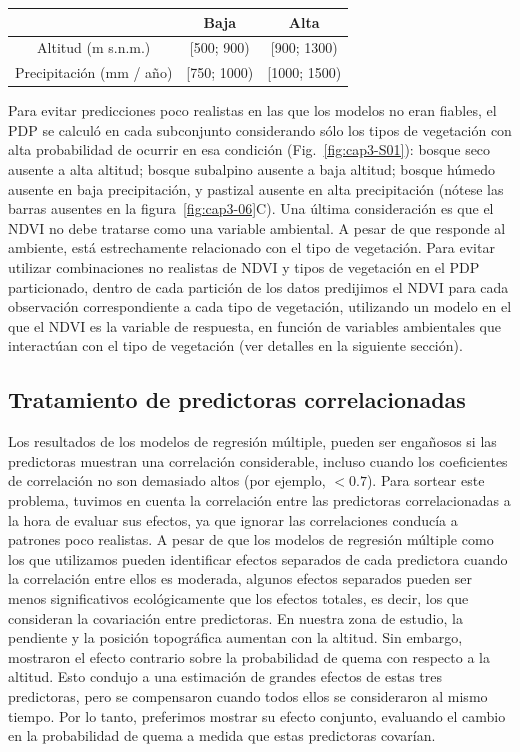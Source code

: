 \begin{table}[h!]
\centering
\begin{tabular}{c|cc}
  & Baja & Alta \\
\hline
Altitud (m s.n.m.) & [500; 900) & [900; 1300) \\
Precipitación (mm / año) & [750; 1000) & [1000; 1500) \\
\end{tabular}
\end{table}

Para evitar predicciones poco realistas en las que los modelos no eran fiables, el PDP se calculó en cada subconjunto considerando sólo los tipos de vegetación con alta probabilidad de ocurrir en esa condición (Fig.~\ref{fig:cap3-S01}): bosque seco ausente a alta altitud; bosque subalpino ausente a baja altitud; bosque húmedo ausente en baja precipitación, y pastizal ausente en alta precipitación (nótese las barras ausentes en la figura~\ref{fig:cap3-06}C).
Una última consideración es que el NDVI no debe tratarse como una variable ambiental. A pesar de que responde al ambiente, está estrechamente relacionado con el tipo de vegetación. Para evitar utilizar combinaciones no realistas de NDVI y tipos de vegetación en el PDP particionado, dentro de cada partición de los datos predijimos el NDVI para cada observación correspondiente a cada tipo de vegetación, utilizando un modelo en el que el NDVI es la variable de respuesta, en función de variables ambientales que interactúan con el tipo de vegetación (ver detalles en la siguiente sección).

\subsection{Tratamiento de predictoras correlacionadas}\label{append:cov}

Los resultados de los modelos de regresión múltiple, pueden ser engañosos si las predictoras muestran una correlación considerable, incluso cuando los coeficientes de correlación no son demasiado altos (por ejemplo, $< 0.7$). Para sortear este problema, tuvimos en cuenta la correlación entre las predictoras correlacionadas a la hora de evaluar sus efectos, ya que ignorar las correlaciones conducía a patrones poco realistas. A pesar de que los modelos de regresión múltiple como los que utilizamos pueden identificar efectos separados de cada predictora cuando la correlación entre ellos es moderada, algunos efectos separados pueden ser menos significativos ecológicamente que los efectos totales, es decir, los que consideran la covariación entre predictoras. 
En nuestra zona de estudio, la pendiente y la posición topográfica aumentan con la altitud. Sin embargo, mostraron el efecto contrario sobre la probabilidad de quema con respecto a la altitud. Esto condujo a una estimación de grandes efectos de estas tres predictoras, pero se compensaron cuando todos ellos se consideraron al mismo tiempo. Por lo tanto, preferimos mostrar su efecto conjunto, evaluando el cambio en la probabilidad de quema a medida que estas predictoras covarían.

